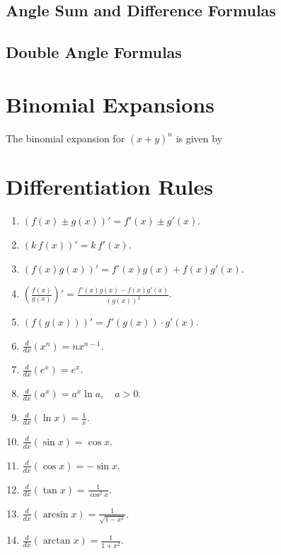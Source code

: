 \documentclass{article}
\begin{document}
\subsection{Angle Sum and Difference Formulas}
\subsection{Double Angle Formulas}

\section{Binomial Expansions}
The binomial expansion for \((x+y)^n\) is given by

\section{Differentiation Rules}
\begin{enumerate}
  \item \((f(x)\pm g(x))' = f'(x)\pm g'(x)\).
  \item \((k\,f(x))' = k\,f'(x)\).
  \item \((f(x)g(x))' = f'(x)g(x)+f(x)g'(x)\).
  \item \(\left(\frac{f(x)}{g(x)}\right)'=\frac{f'(x)g(x)-f(x)g'(x)}{(g(x))^2}\).
  \item \((f(g(x)))' = f'(g(x))\cdot g'(x)\).
  \item \(\frac{d}{dx}(x^n)=nx^{n-1}\).
  \item \(\frac{d}{dx}(e^x)=e^x\).
  \item \(\frac{d}{dx}(a^x)=a^x\ln a,\quad a>0\).
  \item \(\frac{d}{dx}(\ln x)=\frac{1}{x}\).
  \item \(\frac{d}{dx}(\sin x)=\cos x\).
  \item \(\frac{d}{dx}(\cos x)=-\sin x\).
  \item \(\frac{d}{dx}(\tan x)=\frac{1}{\cos^2 x}\).
  \item \(\frac{d}{dx}(\arcsin x)=\frac{1}{\sqrt{1-x^2}}\).
  \item \(\frac{d}{dx}(\arctan x)=\frac{1}{1+x^2}\).
\end{enumerate}
\end{document}
